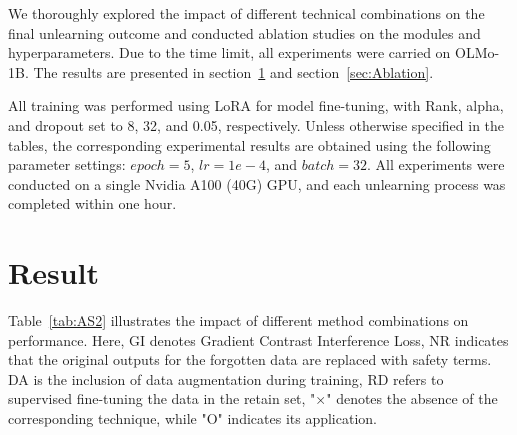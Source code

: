 \documentclass[11pt]{article}
\begin{document}
We thoroughly explored the impact of different technical combinations on the final unlearning outcome and conducted ablation studies on the modules and hyperparameters. Due to the time limit, all experiments were carried on OLMo-1B. The results are presented in section~\ref{sec:Result} and section~\ref{sec:Ablation}.

All training was performed using LoRA \cite{hu2022lora} for model fine-tuning, with Rank, alpha, and dropout set to 8, 32, and 0.05, respectively. Unless otherwise specified in the tables, the corresponding experimental results are obtained using the following parameter settings: $epoch=5$, $lr=1e-4$, and $batch=32$. All experiments were conducted on a single Nvidia A100 (40G) GPU, and each unlearning process was completed within one hour.

\section{Result}
\label{sec:Result}



Table~\ref{tab:AS2} illustrates the impact of different method combinations on performance. Here, GI denotes Gradient Contrast Interference Loss, NR indicates that the original outputs for the forgotten data are replaced with safety terms. DA is the inclusion of data augmentation during training, RD refers to supervised fine-tuning the data in the retain set,
"×" denotes the absence of the corresponding technique, while "O" indicates its application.
\end{document}
